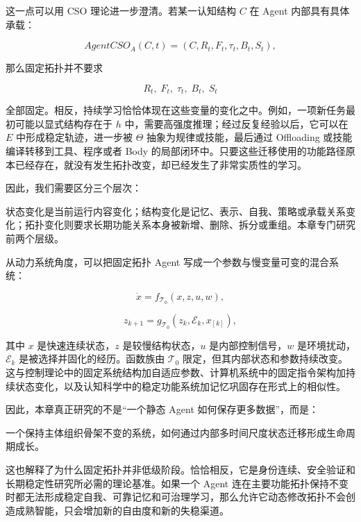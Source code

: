 这一点可以用 CSO 理论进一步澄清。若某一认知结构 $C$ 在 Agent 内部具有具体承载：

\[
AgentCSO_A(C,t)
=
(C,R_t,F_t,\tau_t,B_t,S_t),
\]

那么固定拓扑并不要求

\[
R_t,\;F_t,\;\tau_t,\;B_t,\;S_t
\]

全部固定。相反，持续学习恰恰体现在这些变量的变化之中。例如，一项新任务最初可能以显式结构存在于 $h$ 中，需要高强度推理；经过反复经验以后，它可以在 $E$ 中形成稳定轨迹，进一步被 $\Theta$ 抽象为规律或技能，最后通过 Offloading 或技能编译转移到工具、程序或者 Body 的局部闭环中。只要这些迁移使用的功能路径原本已经存在，就没有发生拓扑改变，却已经发生了非常实质性的学习。

因此，我们需要区分三个层次：

\begin{statementbox}
\centering
{}
\end{statementbox}

状态变化是当前运行内容变化；结构变化是记忆、表示、自我、策略或承载关系变化；拓扑变化则要求长期功能关系本身被新增、删除、拆分或重组。本章专门研究前两个层级。

从动力系统角度，可以把固定拓扑 Agent 写成一个参数与慢变量可变的混合系统：

\[
\dot{x}
=
f_{\mathcal{T}_0}
\left(
x,
z,
u,
w
\right),
\]

\[
z_{k+1}
=
g_{\mathcal{T}_0}
\left(
z_k,
\mathcal{E}_k,
x_{[k]}
\right),
\]

其中 $x$ 是快速连续状态，$z$ 是较慢结构状态，$u$ 是内部控制信号，$w$ 是环境扰动，$\mathcal{E}_k$ 是被选择并固化的经历。函数族由 $\mathcal{T}_0$ 限定，但其内部状态和参数持续改变。这与控制理论中的固定系统结构加自适应参数、计算机系统中的固定指令架构加持续状态变化，以及认知科学中的稳定功能系统加记忆巩固存在形式上的相似性。

因此，本章真正研究的不是“一个静态 Agent 如何保存更多数据”，而是：

\begin{statementbox}
一个保持主体组织骨架不变的系统，如何通过内部多时间尺度状态迁移形成生命周期成长。
\end{statementbox}

这也解释了为什么固定拓扑并非低级阶段。恰恰相反，它是身份连续、安全验证和长期稳定性研究所必需的理论基准。如果一个 Agent 连在主要功能拓扑保持不变时都无法形成稳定自我、可靠记忆和可治理学习，那么允许它动态修改拓扑不会创造成熟智能，只会增加新的自由度和新的失稳渠道。

